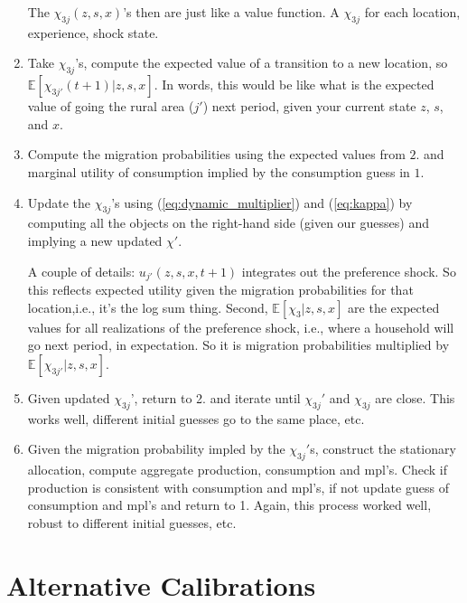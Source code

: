 \documentclass[12pt,pdftex]{article}
\begin{document}
\begin{onehalfspacing}
\begin{enumerate}
    The $\chi_{3j}(z, s, x)$'s then are just like a value function. A $\chi_{3j}$ for each location, experience, shock state.

\item Take $\chi_{3j}$'s, compute the expected value of a transition to a new location, so $\mathbb{E}\left[\chi_{3j'}(t+1)| z, s, x \right]$. In words, this would be like what is the expected value of going the rural area ($j'$) next period, given your current state $z$, $s$, and $x$.

\item Compute the migration probabilities using the expected values from $2.$ and marginal utility of consumption implied by the consumption guess in $1.$

\item Update the $\chi_{3j}$'s using (\ref{eq:dynamic_multiplier}) and (\ref{eq:kappa}) by computing all the objects on the right-hand side (given our guesses) and implying a new updated $\chi'$.

A couple of details: $u_{j'}(z,s,x,t+1)$ integrates out the preference shock. So this reflects expected utility given the migration probabilities for that location,i.e., it's the log sum thing. Second, $\mathbb{E}\left[\chi_{3} | z, s, x \right]$ are the expected values for all realizations of the preference shock, i.e., where a household will go next period, in expectation. So it is migration probabilities multiplied by $\mathbb{E}\left[\chi_{3j'}| z,s,x \right]$.

\item Given updated $\chi_{3j}$', return to 2. and iterate until $\chi_{3j}'$ and $\chi_{3j}$ are close. This works well, different initial guesses go to the same place, etc.

\item Given the migration probability impled by the $\chi_{3j}'$s, construct the stationary allocation, compute aggregate production, consumption and mpl's. Check if production is consistent with consumption and mpl's, if not update guess of consumption and mpl's and return to 1. Again, this process worked well, robust to different initial guesses, etc.
\end{enumerate}


\newpage

\section{Alternative Calibrations}


\end{onehalfspacing}
\end{document}
